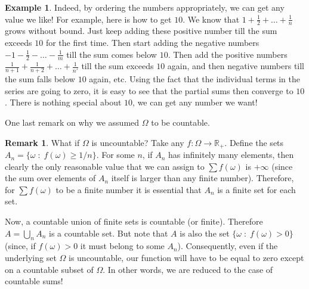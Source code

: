 \documentclass[preprint,  11pt]{amsart}
\theoremstyle{plain} %
\theoremstyle{definition} %
\newtheorem{remark}[theorem]{Remark}
\newtheorem{example}[theorem]{Example}
\begin{document}
{{{{{{{{{{{\begin{example}
Indeed, by ordering the numbers appropriately, we can get any value we like! For example, here is how to get $10$. We know that $1+\frac{1}{2}+\ldots +\frac{1}{n}$ grows without bound. Just keep adding these positive number till the sum exceeds $10$ for the first time. Then start adding the negative numbers $-1-\frac{1}{2}-\ldots -\frac{1}{m}$ till the sum comes below $10$. Then add the positive numbers $\frac{1}{n+1}+\frac{1}{n+2}+\ldots +\frac{1}{n'}$ till the sum exceeds $10$ again, and then negative numbers till the sum falls below $10$ again, etc. Using the fact that the individual terms in the series are going to zero, it is easy to see that the partial sums then converge to $10$. There is nothing special about $10$, we can get any number we want!
\end{example}
One last remark on why we assumed $\Omega$ to be countable.
\begin{remark} What if $\Omega$ is uncountable? Take any $f:\Omega\rightarrow \mathbb{R}_{+}$. Define the sets $A_{n}=\{\omega{\; : \;} f(\omega)\ge 1/n\}$. For some $n$, if $A_{n}$ has infinitely many elements, then clearly the only reasonable value that we can assign to $\sum f(\omega)$ is $+\infty$ (since the sum over elements of $A_{n}$ itself is larger than any finite number). Therefore, for $\sum f(\omega)$ to be a finite number it is essential that $A_{n}$ is a finite set for each set.

Now, a countable union of finite sets is countable (or finite). Therefore $A=\bigcup_{n}A_{n}$ is a countable set. But note that $A$ is also the set $\{\omega{\; : \;} f(\omega)>0\}$ (since, if $f(\omega)>0$ it must belong to some $A_{n}$). Consequently, even if the underlying set $\Omega$ is uncountable, our function will have to be equal to zero except on a countable subset of $\Omega$. In other words, we are reduced to the case of countable sums!
\end{remark}

}}}}}}}}}}}
\end{document}

